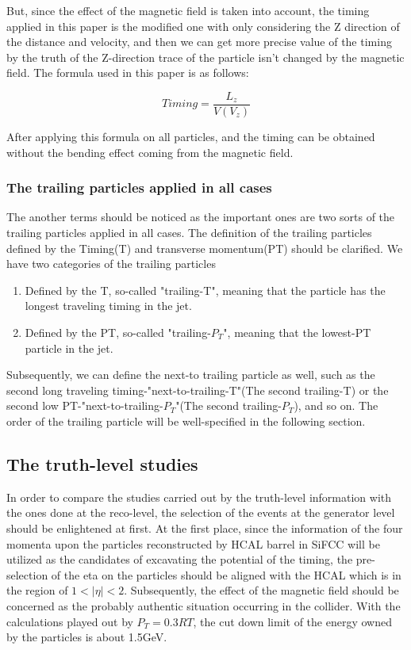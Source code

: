 But, since the effect of the magnetic field is taken into account, the timing applied in this paper is the modified one with only considering the Z direction of the distance and velocity, and then we can get more precise value of the timing by the truth of the Z-direction trace of the particle isn't changed by the magnetic field. The formula used in this paper is as follows: 

\begin{equation}
 Timing = \frac{L_{z}}{V(V_{z})} 
\end{equation}

After applying this formula on all particles, and the timing can be obtained without the bending effect coming from the magnetic field.\\ 

\subsubsection{The trailing particles applied in all cases}
The another terms should be noticed as the important ones are two sorts of the trailing particles applied in all cases. The definition of the trailing particles defined by the Timing(T) and transverse momentum(PT) should be clarified. We have two categories of the trailing particles
\begin{enumerate}
\item Defined by the T, so-called "trailing-T", meaning that the particle has the longest traveling timing in the jet. 
\item Defined by the PT, so-called "trailing-$P_{T}$", meaning that the lowest-PT particle in the jet. 
\end{enumerate}

Subsequently, we can define the next-to trailing particle as well, such as the second long traveling timing-"next-to-trailing-T"(The second trailing-T) or the second low PT-"next-to-trailing-$P_{T}$"(The second trailing-$P_{T}$), and so on. The order of the trailing particle will be well-specified in the following section.

\subsection{The truth-level studies}

In order to compare the studies carried out by the truth-level information with the ones done at the reco-level, the selection of the events at the generator level should be enlightened at first. At the first place, since the information of the four momenta upon the particles reconstructed by HCAL barrel in SiFCC will be utilized as the candidates of excavating the potential of the timing, the pre-selection of the eta on the particles should be aligned with the HCAL which is in the region of  $1<| \eta |<2$. Subsequently, the effect of the magnetic field should be concerned as the probably authentic situation occurring in the collider. With the calculations played out by $P_{T}=0.3RT$, the cut down limit of the energy owned by the particles is about 1.5GeV.\\     

